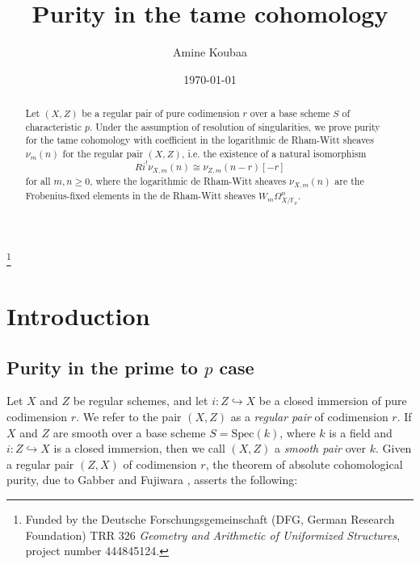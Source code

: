 \documentclass{amsart}
\def\Spec{\textrm{Spec}}
\theoremstyle{definition}
\newcommand{\mF}{\mathbb{F}}
\numberwithin{equation}{section}
\begin{document}
\title[Purity in the tame cohomology]{Purity in the tame cohomology}


\author{Amine Koubaa}
\address{Institut für Algebraische Geometrie, Leibniz Universität Hannover, Welfengarten 1, 30167 Hannover Germany}
\thanks{ Funded by the Deutsche Forschungsgemeinschaft (DFG, German Research Foundation) TRR 326 \textit{Geometry and Arithmetic of Uniformized Structures}, project number 444845124.}



\date{\today}



\begin{abstract}
Let $(X,Z)$ be a regular pair of pure codimension $r$ over a base scheme $S$ of characteristic $p$.  Under the assumption of resolution of singularities, we prove purity for the tame cohomology with coefficient in the logarithmic de Rham-Witt sheaves $\nu_m(n)$ for the regular pair $(X,Z)$, i.e. the existence of a natural isomorphism
\[
Ri^!\nu_{X,m}(n)\cong \nu_{Z,m}(n-r)[-r]
\]
for all $m,n\geq 0$, where the logarithmic de Rham-Witt sheaves $\nu_{X,m}(n)$ are the Frobenius-fixed elements in the de Rham-Witt sheaves $W_m\Omega^{n}_{X/\mF_p}$. 
\end{abstract}

\maketitle
\tableofcontents
\section{Introduction}
\subsection{\texorpdfstring{Purity in the prime to $p$ case}{Purity in the prime to p case}}
Let $X$ and $Z$ be regular schemes, and let $i: Z \hookrightarrow X$ be a closed immersion of pure codimension $r$. We refer to the pair $(X,Z)$ as a \emph{regular pair} of codimension $r$. If $X$ and $Z$ are smooth over a base scheme $S = \Spec(k)$, where $k$ is a field and $i:Z\hookrightarrow X$ is a closed immersion, then we call $(X,Z)$ a \emph{smooth pair} over $k$.
Given a regular pair $(Z, X)$ of codimension $r$, the theorem of absolute cohomological purity, due to Gabber and Fujiwara \cite{FujiwaraPurity}, asserts the following:
\end{document}
